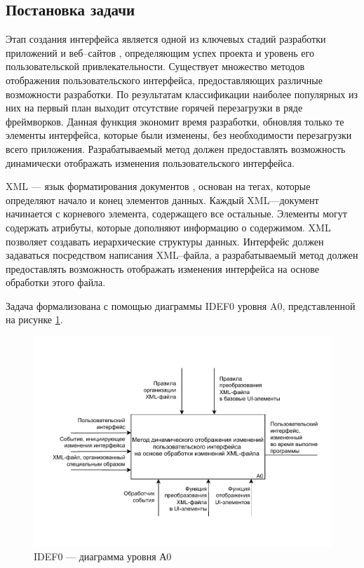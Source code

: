 \subsection{Постановка задачи}

Этап создания интерфейса является одной из ключевых стадий разработки приложений и веб--сайтов \cite{website}, определяющим успех проекта и уровень его пользовательской привлекательности. 
Существует множество методов отображения пользовательского интерфейса, предоставляющих различные возможности разработки. 
По результатам классификации наиболее популярных из них на первый план выходит отсутствие горячей перезагрузки в ряде фреймворков.
Данная функция экономит время разработки, обновляя только те элементы интерфейса, которые были изменены, без необходимости перезагрузки всего приложения. 
Разрабатываемый метод должен предоставлять возможность динамически отображать изменения пользовательского интерфейса.

XML --- язык форматирования документов \cite{xml}, основан на тегах, которые определяют начало и конец элементов данных.
Каждый XML---документ начинается с корневого элемента, содержащего все остальные. 
Элементы могут содержать атрибуты, которые дополняют информацию о содержимом. 
XML позволяет создавать иерархические структуры данных.
Интерфейс должен задаваться посредством написания XML--файла, а разрабатываемый метод должен предоставлять возможность отображать изменения интерфейса на основе обработки этого файла.

Задача формализована с помощью диаграммы IDEF0 уровня A0, представленной на рисунке  \ref{fig:idef0}.

\begin{figure}[!htb]
	\centering
	\includegraphics[scale=1]{img/A0.pdf}
	\caption{IDEF0 --- диаграмма уровня А0}
	\label{fig:idef0}
\end{figure}

